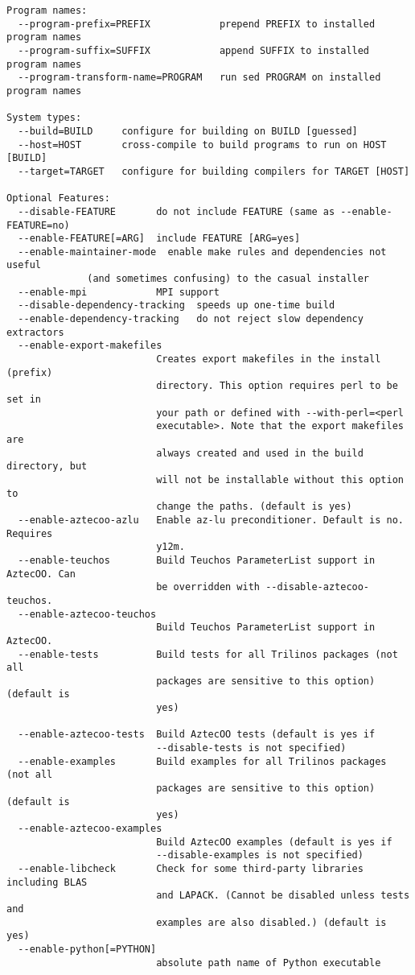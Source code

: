 \begin{verbatim}
Program names:
  --program-prefix=PREFIX            prepend PREFIX to installed program names
  --program-suffix=SUFFIX            append SUFFIX to installed program names
  --program-transform-name=PROGRAM   run sed PROGRAM on installed program names

System types:
  --build=BUILD     configure for building on BUILD [guessed]
  --host=HOST       cross-compile to build programs to run on HOST [BUILD]
  --target=TARGET   configure for building compilers for TARGET [HOST]

Optional Features:
  --disable-FEATURE       do not include FEATURE (same as --enable-FEATURE=no)
  --enable-FEATURE[=ARG]  include FEATURE [ARG=yes]
  --enable-maintainer-mode  enable make rules and dependencies not useful
			  (and sometimes confusing) to the casual installer
  --enable-mpi            MPI support
  --disable-dependency-tracking  speeds up one-time build
  --enable-dependency-tracking   do not reject slow dependency extractors
  --enable-export-makefiles
                          Creates export makefiles in the install (prefix)
                          directory. This option requires perl to be set in
                          your path or defined with --with-perl=<perl
                          executable>. Note that the export makefiles are
                          always created and used in the build directory, but
                          will not be installable without this option to
                          change the paths. (default is yes)
  --enable-aztecoo-azlu   Enable az-lu preconditioner. Default is no. Requires
                          y12m.
  --enable-teuchos        Build Teuchos ParameterList support in AztecOO. Can
                          be overridden with --disable-aztecoo-teuchos.
  --enable-aztecoo-teuchos
                          Build Teuchos ParameterList support in AztecOO.
  --enable-tests          Build tests for all Trilinos packages (not all
                          packages are sensitive to this option) (default is
                          yes)

  --enable-aztecoo-tests  Build AztecOO tests (default is yes if
                          --disable-tests is not specified)
  --enable-examples       Build examples for all Trilinos packages (not all
                          packages are sensitive to this option) (default is
                          yes)
  --enable-aztecoo-examples
                          Build AztecOO examples (default is yes if
                          --disable-examples is not specified)
  --enable-libcheck       Check for some third-party libraries including BLAS
                          and LAPACK. (Cannot be disabled unless tests and
                          examples are also disabled.) (default is yes)
  --enable-python[=PYTHON]
                          absolute path name of Python executable


\end{verbatim}
